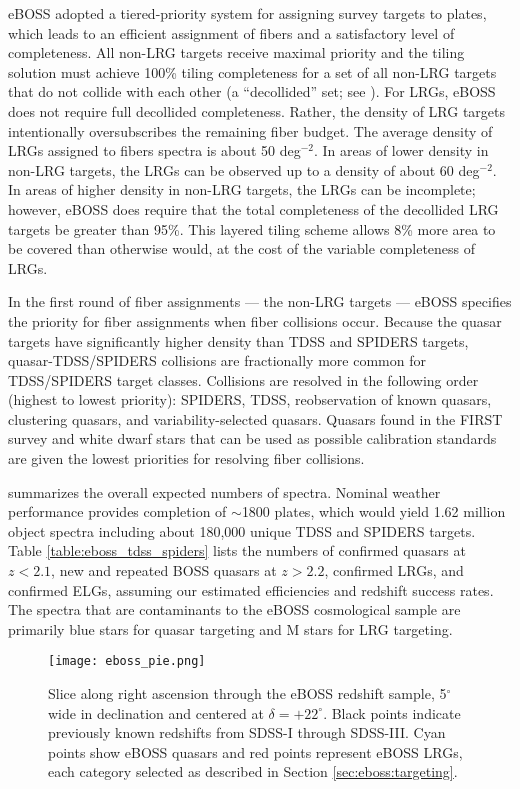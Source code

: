 eBOSS adopted a tiered-priority system for assigning survey targets to
plates, which leads to an efficient assignment of fibers and a
satisfactory level of completeness. All non-LRG targets receive
maximal priority and the tiling solution must achieve 100\% tiling
completeness for a set of all non-LRG targets that do not collide with
each other (a ``decollided'' set; see
\citealt{blanton03a}). For LRGs, eBOSS does not require full
decollided completeness. Rather, the density of LRG targets
intentionally oversubscribes the remaining fiber budget.  The average
density of LRGs assigned to fibers spectra is about 50 deg$^{-2}$.  In
areas of lower density in non-LRG targets, the LRGs can be observed up
to a density of about 60 deg$^{-2}$.  In areas of higher density in
non-LRG targets, the LRGs can be incomplete; however, eBOSS does require
that the total completeness of the decollided LRG targets be greater
than 95\%.  This layered tiling scheme allows 8\% more area to be
covered than otherwise would, at the cost of the variable completeness
of LRGs.

In the first round of fiber assignments --- the non-LRG targets --- 
eBOSS specifies the priority for fiber assignments when fiber collisions
occur.  Because the quasar targets have significantly higher density
than TDSS and SPIDERS targets, quasar-TDSS/SPIDERS collisions are
fractionally more common for TDSS/SPIDERS target classes.  Collisions
are resolved in the following order (highest to lowest priority):
SPIDERS, TDSS, reobservation of known quasars, clustering quasars, and
variability-selected quasars.  Quasars found in the FIRST survey
\citep{becker95a} and white dwarf stars that can be used as possible
calibration standards are given the lowest priorities for resolving
fiber collisions.

\citet{dawson16a} summarizes the overall expected numbers of
spectra. Nominal weather performance provides completion of $\sim$1800
plates, which would yield 1.62 million object spectra including about
180,000 unique TDSS and SPIDERS targets. Table
\ref{table:eboss_tdss_spiders} lists the numbers of confirmed
quasars at $z<2.1$, new and repeated BOSS quasars at $z>2.2$,
confirmed LRGs, and confirmed ELGs, assuming our estimated
efficiencies and redshift success rates.  The spectra that are
contaminants to the eBOSS cosmological sample are primarily blue stars
for quasar targeting and M stars for LRG targeting.

\begin{figure}[t!]
\centering
\texttt{[image: eboss\_pie.png]}
\caption{ \label{fig:eboss_pie} Slice along right ascension through
the eBOSS redshift sample, 5$^\circ$ wide in declination and centered
at $\delta = +22^\circ$. Black points indicate previously known
redshifts from SDSS-I through SDSS-III. Cyan points show eBOSS quasars
and red points represent eBOSS LRGs, each category selected as
described in Section \ref{sec:eboss:targeting}.  }
\end{figure}

